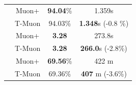\begin{table}[t]
\begin{subtable}{0.51\linewidth}
\begin{tabular}{lccc}
         & \textcolor{dioncolor}{Muon+}   & \textbf{94.04}\%  & 1.359s \\
        & \textcolor{turbomuoncolor}{T-Muon}   & 94.03\%  & \textbf{1.348}s  (-0.8 \%) %
         \\
        \hline
        & \textcolor{dioncolor}{Muon+}   & \textbf{3.28}  & 273.8s \\
         & \textcolor{turbomuoncolor}{T-Muon}   & \textbf{3.28}  & \textbf{266.0}s (-2.8\%) %
         \\
        \hline
         & \textcolor{dioncolor}{Muon+}    & \textbf{69.56}\%  & 422 m \\
         & \textcolor{turbomuoncolor}{T-Muon}   & 69.36\%  & \textbf{407} m (-3.6\%) %
         \\
          

\end{tabular}
\end{subtable}
\end{table}
